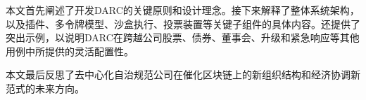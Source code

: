 \documentclass{article}
\begin{document}
本文首先阐述了开发DARC的关键原则和设计理念。接下来解释了整体系统架构，以及插件、多令牌模型、沙盒执行、投票装置等关键子组件的具体内容。还提供了突出示例，以说明DARC在跨越公司股票、债券、董事会、升级和紧急响应等其他用例中所提供的灵活配置性。

本文最后反思了去中心化自治规范公司在催化区块链上的新组织结构和经济协调新范式的未来方向。







































\end{document}

